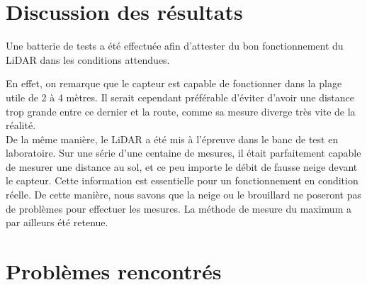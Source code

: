 \section{Discussion des résultats}

Une batterie de tests a été effectuée afin d'attester du bon fonctionnement du LiDAR dans les conditions
attendues.\par
En effet, on remarque que le capteur est capable de fonctionner dans la plage utile de 2 à 
4 mètres. Il serait cependant préférable d'éviter d'avoir une distance trop grande entre ce dernier et 
la route, comme sa mesure diverge très vite de la réalité. \\
De la même manière, le LiDAR a été mis à l'épreuve dans le banc de test en laboratoire. Sur une série 
d'une centaine de mesures, il était parfaitement capable de mesurer une distance au sol, et ce peu importe 
le débit de fausse neige devant le capteur. Cette information est essentielle pour un fonctionnement en
condition réelle. De cette manière, nous savons que la neige ou le brouillard ne poseront pas de problèmes 
pour effectuer les mesures. La méthode de mesure du maximum a par ailleurs été retenue.\\


\section{Problèmes rencontrés}
